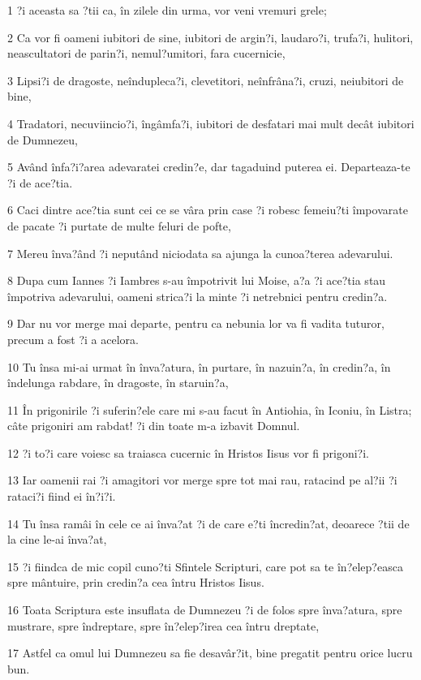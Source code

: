 \par 1 ?i aceasta sa ?tii ca, în zilele din urma, vor veni vremuri grele;
\par 2 Ca vor fi oameni iubitori de sine, iubitori de argin?i, laudaro?i, trufa?i, hulitori, neascultatori de parin?i, nemul?umitori, fara cucernicie,
\par 3 Lipsi?i de dragoste, neîndupleca?i, clevetitori, neînfrâna?i, cruzi, neiubitori de bine,
\par 4 Tradatori, necuviincio?i, îngâmfa?i, iubitori de desfatari mai mult decât iubitori de Dumnezeu,
\par 5 Având înfa?i?area adevaratei credin?e, dar tagaduind puterea ei. Departeaza-te ?i de ace?tia.
\par 6 Caci dintre ace?tia sunt cei ce se vâra prin case ?i robesc femeiu?ti împovarate de pacate ?i purtate de multe feluri de pofte,
\par 7 Mereu înva?ând ?i neputând niciodata sa ajunga la cunoa?terea adevarului.
\par 8 Dupa cum Iannes ?i Iambres s-au împotrivit lui Moise, a?a ?i ace?tia stau împotriva adevarului, oameni strica?i la minte ?i netrebnici pentru credin?a.
\par 9 Dar nu vor merge mai departe, pentru ca nebunia lor va fi vadita tuturor, precum a fost ?i a acelora.
\par 10 Tu însa mi-ai urmat în înva?atura, în purtare, în nazuin?a, în credin?a, în îndelunga rabdare, în dragoste, în staruin?a,
\par 11 În prigonirile ?i suferin?ele care mi s-au facut în Antiohia, în Iconiu, în Listra; câte prigoniri am rabdat! ?i din toate m-a izbavit Domnul.
\par 12 ?i to?i care voiesc sa traiasca cucernic în Hristos Iisus vor fi prigoni?i.
\par 13 Iar oamenii rai ?i amagitori vor merge spre tot mai rau, ratacind pe al?ii ?i rataci?i fiind ei în?i?i.
\par 14 Tu însa ramâi în cele ce ai înva?at ?i de care e?ti încredin?at, deoarece ?tii de la cine le-ai înva?at,
\par 15 ?i fiindca de mic copil cuno?ti Sfintele Scripturi, care pot sa te în?elep?easca spre mântuire, prin credin?a cea întru Hristos Iisus.
\par 16 Toata Scriptura este insuflata de Dumnezeu ?i de folos spre înva?atura, spre mustrare, spre îndreptare, spre în?elep?irea cea întru dreptate,
\par 17 Astfel ca omul lui Dumnezeu sa fie desavâr?it, bine pregatit pentru orice lucru bun.

